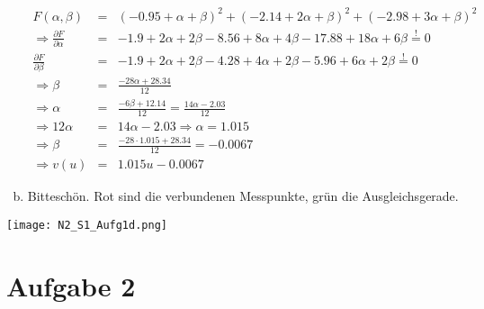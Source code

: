 \documentclass[11pt]{article} %
\begin{document}
\begin{enumerate}[a)]
\begin{eqnarray*}
F(\alpha, \beta) &=& (-0.95 + \alpha + \beta)^2 + (-2.14 + 2\alpha + \beta)^2 + (-2.98 + 3\alpha + \beta)^2 \\
\Rightarrow \frac{\partial F}{\partial \alpha} &=& -1.9 + 2\alpha + 2\beta - 8.56 + 8\alpha + 4\beta - 17.88 + 18\alpha + 6\beta \overset{!}{=} 0 \\
\frac{\partial F}{\partial \beta} &=& -1.9 + 2\alpha + 2\beta - 4.28 + 4\alpha + 2\beta - 5.96 + 6\alpha + 2\beta \overset{!}{=} 0 \\
\Rightarrow \beta &=& \frac{-28 \alpha +28.34}{12} \\
\Rightarrow \alpha &=& \frac{-6\beta + 12.14}{12} = \frac{14 \alpha -2.03}{12} \\
\Rightarrow 12\alpha &=& 14\alpha - 2.03 \Rightarrow \alpha = 1.015 \\
\Rightarrow \beta &=& \frac{-28 \cdot 1.015 +28.34}{12} = -0.0067 \\
\Rightarrow v(u) &=& 1.015u - 0.0067
\end{eqnarray*}

\item Bitteschön. Rot sind die verbundenen Messpunkte, grün die Ausgleichsgerade.

\end{enumerate}


\texttt{[image: N2\_S1\_Aufg1d.png]}

\section*{Aufgabe 2}
\end{document}
